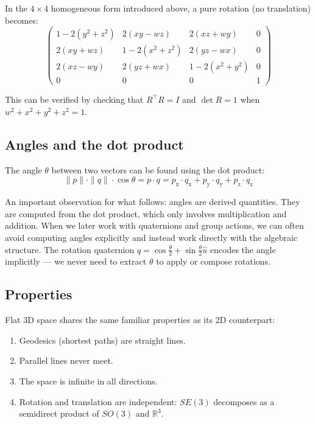 \documentclass[twocolumn,10pt]{article}
\begin{document}
In the $4 \times 4$ homogeneous form introduced above, a pure rotation (no translation) becomes:
\[
    \begin{pmatrix}
        1 - 2(y^2 + z^2) & 2(xy - wz)       & 2(xz + wy)       & 0 \\
        2(xy + wz)       & 1 - 2(x^2 + z^2) & 2(yz - wx)        & 0 \\
        2(xz - wy)       & 2(yz + wx)        & 1 - 2(x^2 + y^2) & 0 \\
        0                & 0                 & 0                  & 1
    \end{pmatrix}
\]

This can be verified by checking that $R^\top R = I$ and $\det R = 1$ when $w^2 + x^2 + y^2 + z^2 = 1$.

\subsection{Angles and the dot product}

The angle $\theta$ between two vectors can be found using the dot product:
\[
    \| p \| \cdot \| q \| \cdot \cos \theta = p \cdot q = p_\mathrm{x} \cdot q_\mathrm{x} + p_\mathrm{y} \cdot q_\mathrm{y} + p_\mathrm{z} \cdot q_\mathrm{z}
\]

An important observation for what follows: angles are derived quantities. They are computed from the dot product, which only involves multiplication and addition. When we later work with quaternions and group actions, we can often avoid computing angles explicitly and instead work directly with the algebraic structure. The rotation quaternion $q = \cos\frac{\theta}{2} + \sin\frac{\theta}{2}\hat{u}$ encodes the angle implicitly --- we never need to extract $\theta$ to apply or compose rotations.

\subsection{Properties}

Flat 3D space shares the same familiar properties as its 2D counterpart:
\begin{enumerate}
    \item Geodesics (shortest paths) are straight lines.
    \item Parallel lines never meet.
    \item The space is infinite in all directions.
    \item Rotation and translation are independent: $SE(3)$ decomposes as a semidirect product of $SO(3)$ and $\mathbb{R}^3$.
\end{enumerate}
\end{document}
